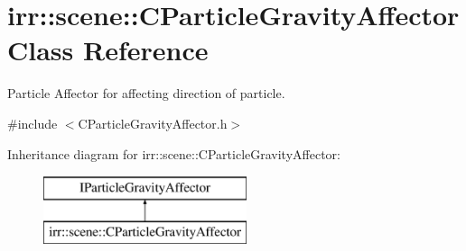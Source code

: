 \hypertarget{classirr_1_1scene_1_1_c_particle_gravity_affector}{\section{irr\-:\-:scene\-:\-:C\-Particle\-Gravity\-Affector Class Reference}
\label{classirr_1_1scene_1_1_c_particle_gravity_affector}
}


Particle Affector for affecting direction of particle.  




{\ttfamily \#include $<$C\-Particle\-Gravity\-Affector.\-h$>$}

Inheritance diagram for irr\-:\-:scene\-:\-:C\-Particle\-Gravity\-Affector\-:\begin{figure}[H]
\begin{center}
\leavevmode
\includegraphics[height=2.000000cm]{classirr_1_1scene_1_1_c_particle_gravity_affector}
\end{center}
\end{figure}
